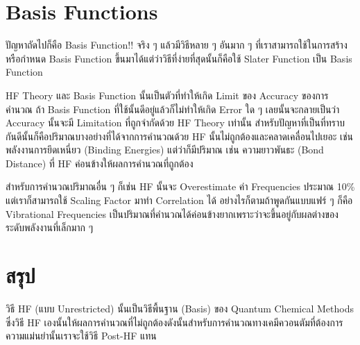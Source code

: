 \section{Basis Functions}

ปัญหาถัดไปก็คือ Basis Function!! จริง ๆ แล้วมีวิธีหลาย ๆ อันมาก ๆ ที่เราสามารถใช้ในการสร้างหรือกำหนด
Basis Function ขึ้นมาได้แต่ว่าวิธีที่ง่ายที่สุดนั้นก็คือใช้ Slater Function เป็น Basis Function

HF Theory และ Basis Function นั้นเป็นตัวที่ทำให้เกิด Limit ของ Accuracy ของการคำนวณ ถ้า Basis
Function ที่ใช้นั้นดีอยู่แล้วก็ไม่ทำให้เกิด Error ใด ๆ เลยนั้นจะกลายเป็นว่า Accuracy นั้นจะมี Limitation
ที่ถูกจำกัดด้วย HF Theory เท่านั้น สำหรับปัญหาที่เป็นที่ทราบกันดีนั้นก็คือปริมาณบางอย่างที่ได้จากการคำนวณด้วย HF
นั้นไม่ถูกต้องและคลาดเคลื่อนไปเยอะ เช่น พลังงานการยึดเหนี่ยว (Binding Energies) แต่ว่าก็มีปริมาณ 
เช่น ความยาวพันธะ (Bond Distance) ที่ HF ค่อนข้างให้ผลการคำนวณที่ถูกต้อง

สำหรับการคำนวณปริมาณอื่น ๆ ก็เช่น HF นั้นจะ Overestimate ค่า Frequencies ประมาณ 10\% แต่เราก็สามารถใช้
Scaling Factor มาทำ Correlation ได้ อย่างไรก็ตามถ้าพูดกันแบบแฟร์ ๆ ก็คือ Vibrational Frequencies
เป็นปริมาณที่คำนวณได้ค่อนข้างยากเพราะว่าจะขึ้นอยู่กับผลต่างของระดับพลังงานที่เล็กมาก ๆ

\section{สรุป}

วิธี HF (แบบ Unrestricted) นั้นเป็นวิธีพื้นฐาน (Basis) ของ Quantum Chemical Methods ซึ่งวิธี HF
เองนั้นให้ผลการคำนวณที่ไม่ถูกต้องดังนั้นสำหรับการคำนวณทางเคมีควอนตัมที่ต้องการความแม่นยำนั้นเราจะใช้วิธี
Post-HF แทน
